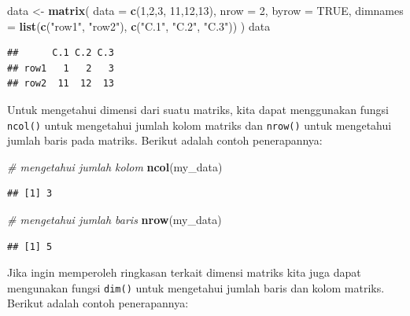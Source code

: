 \documentclass[]{book}
\newenvironment{Shaded}{\begin{snugshade}}{\end{snugshade}}
\newcommand{\CommentTok}[1]{\textcolor[rgb]{0.56,0.35,0.01}{\textit{#1}}}
\newcommand{\DataTypeTok}[1]{\textcolor[rgb]{0.13,0.29,0.53}{#1}}
\newcommand{\DecValTok}[1]{\textcolor[rgb]{0.00,0.00,0.81}{#1}}
\newcommand{\KeywordTok}[1]{\textcolor[rgb]{0.13,0.29,0.53}{\textbf{#1}}}
\newcommand{\NormalTok}[1]{#1}
\newcommand{\OtherTok}[1]{\textcolor[rgb]{0.56,0.35,0.01}{#1}}
\newcommand{\StringTok}[1]{\textcolor[rgb]{0.31,0.60,0.02}{#1}}
\theoremstyle{definition}
\theoremstyle{definition}
\theoremstyle{definition}
\theoremstyle{remark}
\begin{document}
\begin{Shaded}
\begin{Highlighting}[]
\NormalTok{data <-}\StringTok{ }\KeywordTok{matrix}\NormalTok{(}
           \DataTypeTok{data =} \KeywordTok{c}\NormalTok{(}\DecValTok{1}\NormalTok{,}\DecValTok{2}\NormalTok{,}\DecValTok{3}\NormalTok{, }\DecValTok{11}\NormalTok{,}\DecValTok{12}\NormalTok{,}\DecValTok{13}\NormalTok{), }
           \DataTypeTok{nrow =} \DecValTok{2}\NormalTok{, }\DataTypeTok{byrow =} \OtherTok{TRUE}\NormalTok{,}
           \DataTypeTok{dimnames =} \KeywordTok{list}\NormalTok{(}\KeywordTok{c}\NormalTok{(}\StringTok{"row1"}\NormalTok{, }\StringTok{"row2"}\NormalTok{), }
                           \KeywordTok{c}\NormalTok{(}\StringTok{"C.1"}\NormalTok{, }\StringTok{"C.2"}\NormalTok{, }\StringTok{"C.3"}\NormalTok{))}
\NormalTok{           )}
\NormalTok{data}
\end{Highlighting}
\end{Shaded}

\begin{verbatim}
##      C.1 C.2 C.3
## row1   1   2   3
## row2  11  12  13
\end{verbatim}

Untuk mengetahui dimensi dari suatu matriks, kita dapat menggunakan fungsi \texttt{ncol()} untuk mengetahui jumlah kolom matriks dan \texttt{nrow()} untuk mengetahui jumlah baris pada matriks. Berikut adalah contoh penerapannya:

\begin{Shaded}
\begin{Highlighting}[]
\CommentTok{# mengetahui jumlah kolom}
\KeywordTok{ncol}\NormalTok{(my_data)}
\end{Highlighting}
\end{Shaded}

\begin{verbatim}
## [1] 3
\end{verbatim}

\begin{Shaded}
\begin{Highlighting}[]
\CommentTok{# mengetahui jumlah baris}
\KeywordTok{nrow}\NormalTok{(my_data)}
\end{Highlighting}
\end{Shaded}

\begin{verbatim}
## [1] 5
\end{verbatim}

Jika ingin memperoleh ringkasan terkait dimensi matriks kita juga dapat mengunakan fungsi \texttt{dim()} untuk mengetahui jumlah baris dan kolom matriks. Berikut adalah contoh penerapannya:
\end{document}
